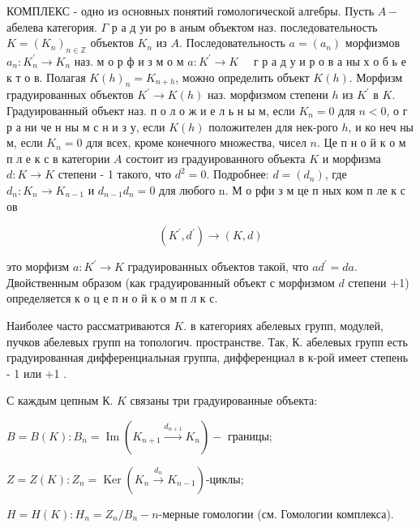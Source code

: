 \documentclass[10pt]{article}
\begin{document}
КОМПЛЕКС - одно из основных понятий гомологической алгебры. Пусть $A-$ абелева категория. $\Gamma$ р а д уи ро в аным объектом наз. последовательность $K=\left(K_{n}\right)_{n \in \mathbb{Z}}$ объектов $K_{n}$ из $A$. Последовательность $a=\left(a_{n}\right)$ морфизмов $a_{n}: K_{n}^{\prime} \rightarrow K_{n}$ наз. м о р ф и з м о м $a: K^{\prime} \rightarrow K \quad$ г р а д у и р о в а ны х о б ь е к т о в. Полагая $K(h)_{n}=K_{n+h}$, можно определить объект $K(h)$. Морфизм градуированных объектов $K^{\prime} \rightarrow K(h)$ наз. морфизмом степени $h$ из $K^{\prime}$ в $K$. Градуированный объект наз. п о л о ж и е л ь н ы м, если $K_{n}=0$ для $n<0$, о г р а ни че н ны м с н и з у, если $K(h)$ положителен для нек-рого $h$, и ко неч ны м, если $K_{n}=0$ для всех, кроме конечного множества, чисел $n$. Це п н о й к о м п л е к с в категории $A$ состоит из градуированного объекта $K$ и морфизма $d: K \rightarrow K$ степени - 1 такого, что $d^{2}=0$. Подробнее: $d=\left(d_{n}\right)$, где $d_{n}: K_{n} \rightarrow K_{n-1}$ и $d_{n-1} d_{n}=0$ для любого n. М о рфи з м це п ных ком п ле к с ов



\[

\left(K^{\prime}, d^{\prime}\right) \longrightarrow(K, d)

\]



это морфизм $a: K^{\prime} \rightarrow K$ градуированных объектов такой, что $a d^{\prime}=d a$. Двойственным образом (как градуированный объект с морфизмом $d$ степени +1) определяется к о ц е п н о й к о м п л к с.



Наиболее часто рассматриваются $K$. в категориях абелевых групп, модулей, пучков абелевых групп на топологич. пространстве. Так, К. абелевых групп есть градуированная дифференциальная группа, дифференциал в к-рой имеет степень - 1 или +1 .



С каждым цепным К. $K$ связаны три градуированные объекта:



$B=B(K): B_{n}=\operatorname{Im}\left(K_{n+1} \stackrel{d_{n+1}}{\longrightarrow} K_{n}\right)-$ границы;



$Z=Z(K): Z_{n}=\operatorname{Ker}\left(K_{n} \stackrel{d_{n}}{\longrightarrow} K_{n-1}\right)$-циклы;



$H=H(K): H_{n}=Z_{n} / B_{n}-n$-мерные гомологии (см. Гомологии комплекса).
\end{document}
